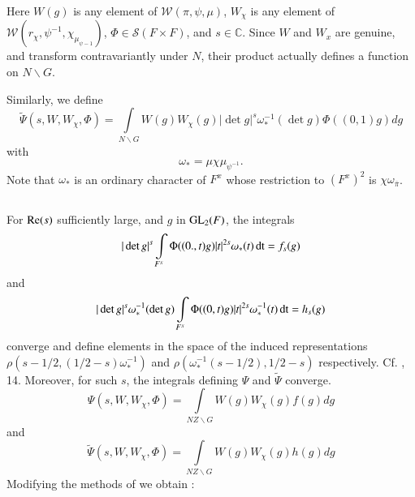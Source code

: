 Here $W(g)$ is any element of $\mathscr{W}(\pi,\psi,\mu)$, $W_{\chi}$ is any element of $\mathscr{W}(r_{\chi},\psi^{-1},\chi_{\mu_{\psi-1}})$, $\Phi\in \mathscr{S}(F\times F)$, and $s\in \mathbb{C}$. Since $W$ and $W_{x}$ are genuine, and transform contravariantly under $N$, their product actually defines a function on $N\backslash G$.

Similarly, we define
\begin{equation}
\widetilde{\Psi}(s,W,W_{\chi},\Phi)=\int\limits_{N\backslash G}W(g)W_{\chi}(g)|\det g|^{s}\omega^{-1}_{*}(\det g)\Phi((0,1)g)dg\label{art1-eq5.1.2}
\end{equation}
with 
\begin{equation}
\omega_{*}=\mu \chi \mu_{\psi^{-1}}.\label{art1-eq5.1.3}
\end{equation}
Note that $\omega_{*}$ is an ordinary character of $F^{x}$ whose restriction to $(F^{x})^{2}$ is $\chi \omega_{\overline{\pi}}$.

\subsection{}\label{art1-sec5.2}\pageoriginale
For $\mathrm{Re}(s)$ sufficiently large, and $g$ in $\mathrm{GL}_{2}(F)$, the integrals
\setcounter{equation}{0}
\begin{equation}
|\det g|^{s}\int\limits_{F^{x}}\Phi ((0.,t)g)|t|^{2s}\omega_{*}(t)\operatorname{dt}=f_{s}(g)\label{art1-eq5.2.1}
\end{equation}
and
\begin{equation}
|\det g|^{s}\omega^{-1}_{*}(\det g)\int\limits_{F^{x}}\Phi((0,t)g)|t|^{2s}\omega^{-1}_{*}(t)\operatorname{dt} = h_{s}(g)\label{art1-eq5.2.2}
\end{equation}
converge and define elements in the space of the induced representations $\rho(s-1/2, (1/2-s)\omega^{-1}_{*})$ and $\rho(\omega^{-1}_{*}(s-1/2),1/2-s)$ respectively. Cf. \cite{Ja}, 14. Moreover, for such $s$, the integrals defining $\Psi$ and $\widetilde{\Psi}$ converge.
\begin{equation}
\Psi(s,W,W_{\chi},\Phi)=\int\limits_{NZ\backslash G}W(g)W_{\chi}(g)f(g)dg\label{art1-eq5.2.3}
\end{equation}
and
$$
\widetilde{\Psi}(s,W,W_{\chi},\Phi)=\int\limits_{NZ\backslash G}W(g)W_{\chi}(g)h(g)dg
$$
Modifying the methods of \cite{Ja} we obtain :


